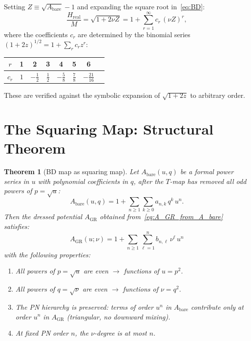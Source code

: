 \documentclass[11pt,a4paper]{article}
\theoremstyle{plain}
\newtheorem{theorem}{Theorem}[section]
\theoremstyle{definition}
\theoremstyle{remark}
\newcommand{\Hreal}{H_{\mathrm{real}}}
\newcommand{\GR}{\mathrm{GR}}
\newcommand{\bare}{\mathrm{bare}}
\begin{document}
Setting $Z \equiv \sqrt{A_\bare} - 1$ and expanding the square root in~\eqref{eq:BD}:
\begin{equation}
  \frac{\Hreal}{M} = \sqrt{1 + 2\nu Z}
  = 1 + \sum_{r=1}^{\infty} c_r\,(\nu Z)^r,
  \label{eq:BD_expansion}
\end{equation}
where the coefficients $c_r$ are determined by the binomial series
$(1+2z)^{1/2} = 1 + \sum_r c_r z^r$:

\begin{center}
\renewcommand{\arraystretch}{1.35}
\begin{tabular}{cccccccc}
\toprule
$r$ & 1 & 2 & 3 & 4 & 5 & 6 \\
\midrule
$c_r$ & $1$ & $-\tfrac{1}{2}$ & $\tfrac{1}{2}$ & $-\tfrac{5}{8}$ & $\tfrac{7}{8}$ & $-\tfrac{21}{16}$ \\
\bottomrule
\end{tabular}
\end{center}

These are verified against the symbolic expansion of $\sqrt{1+2z}$ to arbitrary order.

\section{The Squaring Map: Structural Theorem}
\label{sec:squaring}

\begin{theorem}[BD map as squaring map]
\label{thm:squaring}
Let $A_\bare(u,q)$ be a formal power series in $u$ with polynomial coefficients
in $q$, after the $T$-map has removed all odd powers of $p = \sqrt{u}$:
\begin{equation}
  A_\bare(u,q) = 1 + \sum_{n\geq 1}\sum_{k\geq 0} a_{n,k}\,q^k\,u^n.
  \label{eq:A_bare_form}
\end{equation}
Then the dressed potential $A_\GR$ obtained from~\eqref{eq:A_GR_from_A_bare}
satisfies:
\begin{equation}
  A_\GR(u;\nu) = 1 + \sum_{n\geq 1}\sum_{\ell=1}^{n} b_{n,\ell}\,\nu^\ell\,u^n
  \label{eq:A_GR_form}
\end{equation}
with the following properties:
\begin{enumerate}[nosep,label=\rm(\roman*)]
  \item All powers of $p = \sqrt{u}$ are even $\to$ functions of $u = p^2$.
  \item All powers of $q = \sqrt{\nu}$ are even $\to$ functions of $\nu = q^2$.
  \item The PN hierarchy is preserved: terms of order $u^n$ in $A_\bare$ contribute
    only at order $u^n$ in $A_\GR$ (triangular, no downward mixing).
  \item At fixed PN order $n$, the $\nu$-degree is at most $n$.
\end{enumerate}
\end{theorem}
\end{document}

